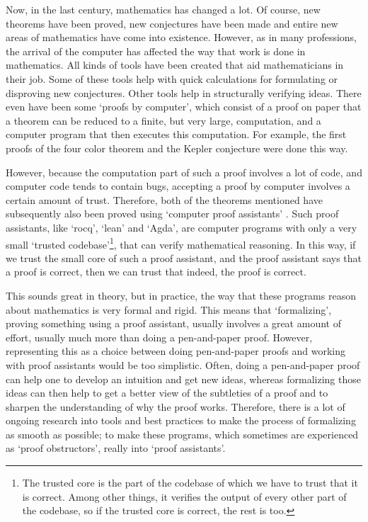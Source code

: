Now, in the last century, mathematics has changed a lot. Of course, new theorems have been proved, new conjectures have been made and entire new areas of mathematics have come into existence. However, as in many professions, the arrival of the computer has affected the way that work is done in mathematics. All kinds of tools have been created that aid mathematicians in their job. Some of these tools help with quick calculations for formulating or disproving new conjectures. Other tools help in structurally verifying ideas. There even have been some `proofs by computer', which consist of a proof on paper that a theorem can be reduced to a finite, but very large, computation, and a computer program that then executes this computation. For example, the first proofs of the four color theorem \autocite{four-color-theorem} and the Kepler conjecture \autocite{Kepler-conjecture} were done this way.

However, because the computation part of such a proof involves a lot of code, and computer code tends to contain bugs, accepting a proof by computer involves a certain amount of trust. Therefore, both of the theorems mentioned have subsequently also been proved using `computer proof assistants' \autocite{formalized-four-color-theorem, formalized-Kepler-conjecture}. Such proof assistants, like `rocq', `lean' and `Agda', are computer programs with only a very small `trusted codebase'\footnote{The trusted core is the part of the codebase of which we have to trust that it is correct. Among other things, it verifies the output of every other part of the codebase, so if the trusted core is correct, the rest is too.}, that can verify mathematical reasoning. In this way, if we trust the small core of such a proof assistant, and the proof assistant says that a proof is correct, then we can trust that indeed, the proof is correct.

This sounds great in theory, but in practice, the way that these programs reason about mathematics is very formal and rigid. This means that `formalizing', proving something using a proof assistant, usually involves a great amount of effort, usually much more than doing a pen-and-paper proof. However, representing this as a choice between doing pen-and-paper proofs and working with proof assistants would be too simplistic. Often, doing a pen-and-paper proof can help one to develop an intuition and get new ideas, whereas formalizing those ideas can then help to get a better view of the subtleties of a proof and to sharpen the understanding of why the proof works. Therefore, there is a lot of ongoing research into tools and best practices to make the process of formalizing as smooth as possible; to make these programs, which sometimes are experienced as `proof obstructors', really into `proof assistants'.

